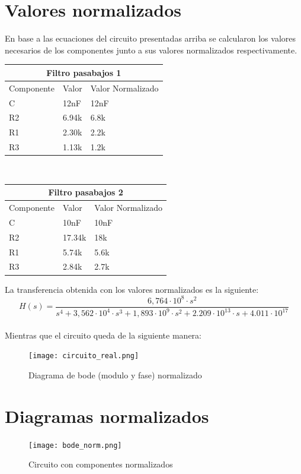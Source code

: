 \documentclass[11pt]{diazessay} %
\begin{document}
\section*{Valores normalizados}
En base a las ecuaciones del circuito presentadas arriba se calcularon los valores necesarios de los componentes junto a sus valores
normalizados respectivamente.\\
\break
\begin{tabular}{ |p{2cm}||p{2cm}|p{6cm}|  }
 \hline
 \multicolumn{3}{|c|}{Filtro pasabajos 1} \\
 \hline
 Componente&Valor&Valor Normalizado\\
 \hline
 C  & 12nF & 12nF\\
 R2  & 6.94k & 6.8k\\
 R1  & 2.30k & 2.2k\\
 R3  & 1.13k & 1.2k\\
 \hline
\end{tabular}\\
\break
\break
\begin{tabular}{ |p{2cm}||p{2cm}|p{6cm}|  }
 \hline
 \multicolumn{3}{|c|}{Filtro pasabajos 2} \\
 \hline
 Componente&Valor&Valor Normalizado\\
 \hline
 C  & 10nF & 10nF\\
 R2  & 17.34k & 18k\\
 R1  & 5.74k & 5.6k\\
 R3  & 2.84k & 2.7k\\
 \hline
\end{tabular}
\break
\break
La transferencia obtenida con los valores normalizados es la siguiente: \\
\begin{equation}
H(s) = \frac{6,764 \cdot 10^8 \cdot s^2}{s^4 + 3,562 \cdot 10^4 \cdot s^3 + 1,893 \cdot 10^9 \cdot s^2 + 2.209 \cdot 10^{13} \cdot s + 4.011 \cdot 10^{17}} 
\end{equation}
\\
Mientras que el circuito queda de la siguiente manera: \\
\begin{figure}[h]
\centering
	\texttt{[image: circuito\_real.png]}
\caption{Diagrama de bode (modulo y fase) normalizado}
\end{figure}


\newpage
\section*{Diagramas normalizados}
\begin{figure}[h]
\centering
	\texttt{[image: bode\_norm.png]}
\caption{Circuito con componentes normalizados}
\end{figure}
\end{document}
